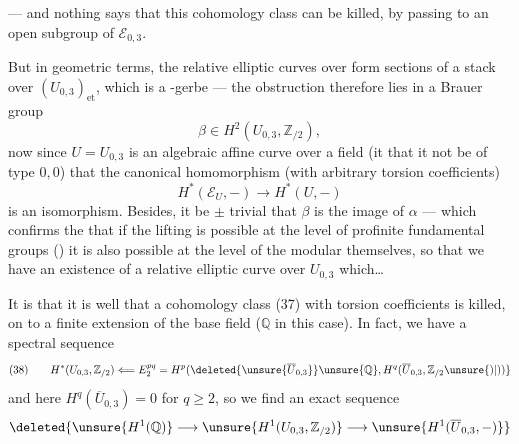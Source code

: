 --- and nothing says that this cohomology class can be killed, by passing to an open subgroup of $\mathcal E_{0,3}$.


But in geometric terms,  the relative elliptic curves  over  form  sections of a stack over $(U_{0,3})_{\mathrm{et}}$, which is a -gerbe --- the obstruction therefore lies in a Brauer group
\[
\beta\in H^2(U_{0,3},\mathbb Z_{/2}), \tag{37}
\]
now since $U=U_{0,3}$ is an algebraic  affine curve over a field (it  that it not be of type $0,0$)  that the canonical homomorphism (with arbitrary torsion coefficients)
\[
H^*(\mathcal E_U,-)\longrightarrow H^*(U,-)
\]
is an isomorphism. Besides, it  be $\pm$ trivial that $\beta$ is the image of $\alpha$ --- which confirms the  that  if the lifting is possible at the level of profinite fundamental groups () it is also possible at the level of the modular  themselves, so that we have an existence of a relative elliptic curve over $U_{0,3}$ which\ldots


It is  that it is well  that a cohomology class (37) with torsion coefficients is killed, on  to a finite extension of the  base field ($\mathbb Q$ in this case). In fact, we have a spectral sequence
\[
(38)\qquad H^*(U_{0,3},\mathbb Z_{/2})
\Longleftarrow E_2^{pq}
=H^p(\deleted{\unsure{\overline U_{0,3}}}\unsure{\mathbb Q},H^q(\overline U_{0,3},\mathbb Z_{/2}\unsure{)|))}
\]
and here $H^q(\overline U_{0,3})=0$ for $q\geq 2$, so we find an exact sequence
\[
\deleted{\unsure{H^1(\mathbb Q)}\longrightarrow
\unsure{H^1(U_{0,3},\mathbb Z_{/2})}\longrightarrow
\unsure{H^1(\overline U_{0,3},-)}}
\]

